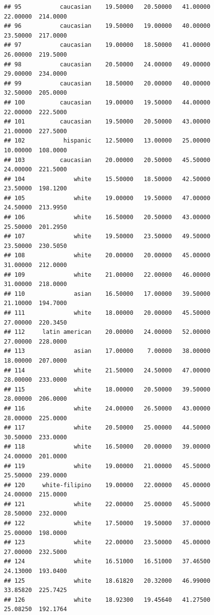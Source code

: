 \documentclass[]{article}
\begin{document}
\begin{verbatim}
## 95           caucasian    19.50000   20.50000   41.00000     22.00000  214.0000
## 96           caucasian    19.50000   19.00000   40.00000     23.50000  217.0000
## 97           caucasian    19.00000   18.50000   41.00000     26.00000  219.5000
## 98           caucasian    20.50000   24.00000   49.00000     29.00000  234.0000
## 99           caucasian    18.50000   20.00000   40.00000     32.50000  205.0000
## 100          caucasian    19.00000   19.50000   44.00000     22.00000  222.5000
## 101          caucasian    19.50000   20.50000   43.00000     21.00000  227.5000
## 102           hispanic    12.50000   13.00000   25.00000     10.00000  108.0000
## 103          caucasian    20.00000   20.50000   45.50000     24.00000  221.5000
## 104              white    15.50000   18.50000   42.50000     23.50000  198.1200
## 105              white    19.00000   19.50000   47.00000     24.50000  213.9950
## 106              white    16.50000   20.50000   43.00000     25.50000  201.2950
## 107              white    19.50000   23.50000   49.50000     23.50000  230.5050
## 108              white    20.00000   20.00000   45.00000     31.00000  212.0000
## 109              white    21.00000   22.00000   46.00000     31.00000  218.0000
## 110              asian    16.50000   17.00000   39.50000     21.10000  194.7000
## 111              white    18.00000   20.00000   45.50000     27.00000  220.3450
## 112     latin american    20.00000   24.00000   52.00000     27.00000  228.0000
## 113              asian    17.00000    7.00000   38.00000     18.00000  207.0000
## 114              white    21.50000   24.50000   47.00000     28.00000  233.0000
## 115              white    18.00000   20.50000   39.50000     28.00000  206.0000
## 116              white    24.00000   26.50000   43.00000     28.00000  225.0000
## 117              white    20.50000   25.00000   44.50000     30.50000  233.0000
## 118              white    16.50000   20.00000   39.00000     24.00000  201.0000
## 119              white    19.00000   21.00000   45.50000     25.50000  239.0000
## 120     white-filipino    19.00000   22.00000   45.00000     24.00000  215.0000
## 121              white    22.00000   25.00000   45.50000     28.50000  232.0000
## 122              white    17.50000   19.50000   37.00000     25.00000  198.0000
## 123              white    22.00000   23.50000   45.00000     27.00000  232.5000
## 124              white    16.51000   16.51000   37.46500     24.13000  193.0400
## 125              white    18.61820   20.32000   46.99000     33.85820  225.7425
## 126              white    18.92300   19.45640   41.27500     25.08250  192.1764

\end{verbatim}
\end{document}
